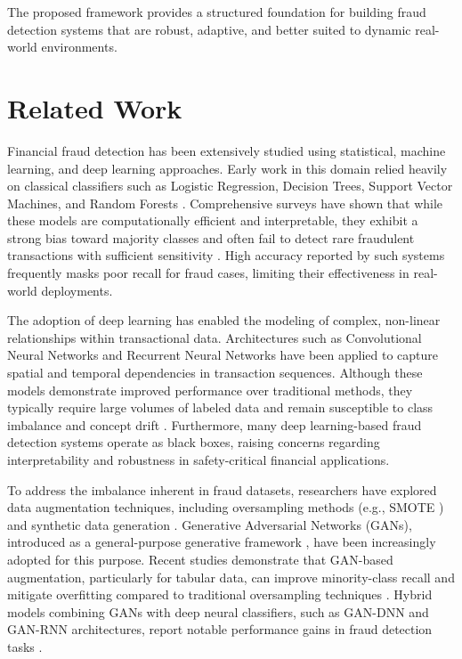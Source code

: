\documentclass[conference]{IEEEtran}
\begin{document}
The proposed framework provides a structured foundation for building fraud detection systems that are robust, adaptive, and better suited to dynamic real-world environments.

\section{Related Work}
Financial fraud detection has been extensively studied using statistical, machine learning, and deep learning approaches. Early work in this domain relied heavily on classical classifiers such as Logistic Regression, Decision Trees, Support Vector Machines, and Random Forests \cite{bhattacharyya2011data, abdou2016credit, kurniawan2020}. Comprehensive surveys have shown that while these models are computationally efficient and interpretable, they exhibit a strong bias toward majority classes and often fail to detect rare fraudulent transactions with sufficient sensitivity \cite{west2016intelligent}. High accuracy reported by such systems frequently masks poor recall for fraud cases, limiting their effectiveness in real-world deployments.

The adoption of deep learning has enabled the modeling of complex, non-linear relationships within transactional data. Architectures such as Convolutional Neural Networks and Recurrent Neural Networks have been applied to capture spatial and temporal dependencies in transaction sequences. Although these models demonstrate improved performance over traditional methods, they typically require large volumes of labeled data and remain susceptible to class imbalance and concept drift \cite{almazroi2023online}. Furthermore, many deep learning-based fraud detection systems operate as black boxes, raising concerns regarding interpretability and robustness in safety-critical financial applications.

To address the imbalance inherent in fraud datasets, researchers have explored data augmentation techniques, including oversampling methods (e.g., SMOTE \cite{chawla2002smote}) and synthetic data generation \cite{fiore2019using}. Generative Adversarial Networks (GANs), introduced as a general-purpose generative framework \cite{goodfellow2014generative}, have been increasingly adopted for this purpose. Recent studies demonstrate that GAN-based augmentation, particularly for tabular data, can improve minority-class recall and mitigate overfitting compared to traditional oversampling techniques \cite{strelcenia2023survey}. Hybrid models combining GANs with deep neural classifiers, such as GAN-DNN and GAN-RNN architectures, report notable performance gains in fraud detection tasks \cite{wang2024research, mienye2024hybrid}.
\end{document}
